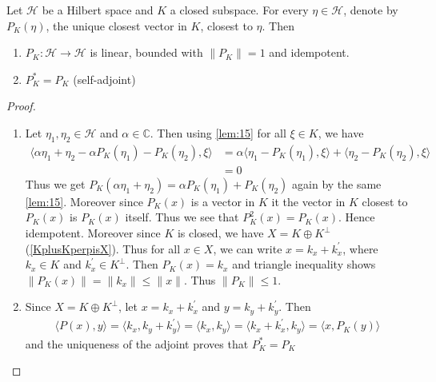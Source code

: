 \begin{theorem}
  Let $\mathcal{H}$ be a Hilbert space and $K$ a closed subspace. For every
  $\eta \in \mathcal{H}$, denote by $P_K(\eta)$, the unique closest vector in
  $K$, closest to $\eta$. Then
  \begin{enumerate}[label=(\arabic*)]
    \item $P_K: \mathcal{H} \to \mathcal{H}$ is linear, bounded with $\|P_K\| =
      1$ and idempotent.
    \item $P_K^* = P_K$ (self-adjoint)
  \end{enumerate}
\end{theorem}
\begin{proof}
  \begin{enumerate}[label=(\arabic*)]
    \item Let $\eta_1, \eta_2 \in \mathcal{H}$ and $\alpha \in \mathbb{C}$.
      Then using \autoref{lem:15} for all $\xi \in K$, we have
      \begin{align*}
        \langle  \alpha \eta_1
        +\eta_2 - \alpha P_K( \eta_1) - P_K(\eta_2) , \xi \rangle &=
        \alpha \langle \eta_1 - P_K(\eta_1) , \xi  \rangle + \langle
        \eta_2 - P_K(\eta_2) , \xi  \rangle  \\
        &= 0
      \end{align*}
      Thus we get $P_K(\alpha \eta_1 + \eta_2) = \alpha P_K(\eta_1) +
      P_K(\eta_2)$ again by the same \autoref{lem:15}. Moreover since
      $P_K(x)$ is a vector in $K$ it the vector in $K$ closest to
      $P_K(x)$ is $P_K(x)$ itself. Thus we see that $P^2_K(x) =
      P_K(x)$. Hence idempotent. Moreover since $K$ is closed, we
      have $X = K \oplus K^\perp$ (\autoref{KplusKperpisX}). Thus for
      all $x \in X$, we can
      write $ x = k_x + k^\prime_x$, where $ k_x \in K$ and $
      k^\prime_x \in K^\perp$. Then $P_K(x) = k_x$ and triangle
      inequality shows $ \|P_K(x)\| = \|k_x\| \le \|x\|$. Thus $\|P_K\| \le 1$.

    \item Since $X = K \oplus K^\perp$, let $x = k_x + k^\prime_x$
      and $y = k_y + k^\prime_y$. Then
      \begin{align*}
        \langle P(x) ,  y \rangle = \langle k_x , k_y + k^\prime_y
        \rangle = \langle k_x , k_y \rangle = \langle k_x  +
        k^\prime_x , k_y \rangle = \langle x , P_K(y) \rangle
      \end{align*}
      and the uniqueness of the adjoint proves that $P_K^* = P_K$
  \end{enumerate}
\end{proof}

